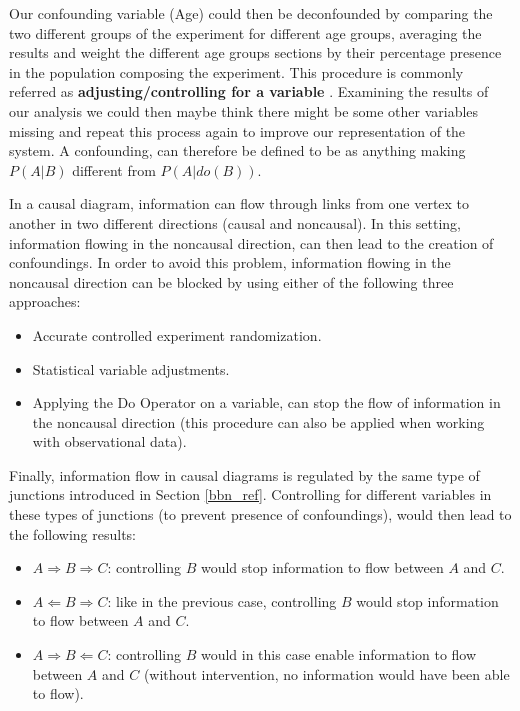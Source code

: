 Our confounding variable (Age) could then be deconfounded by comparing the two different groups of the experiment for different age groups, averaging the results and weight the different age groups sections by their percentage presence in the population composing the experiment. This procedure is commonly referred as \textbf{adjusting/controlling for a variable} \cite{why}. Examining the results of our analysis we could then maybe think there might be some other variables missing and repeat this process again to improve our representation of the system. A confounding, can therefore be defined to be as anything making $P(A|B)$ different from $P(A|do(B))$.   

In a causal diagram, information can flow through links from one vertex to another in two different directions (causal and noncausal). In this setting, information flowing in the noncausal direction, can then lead to the creation of confoundings. In order to avoid this problem, information flowing in the noncausal direction can be blocked by using either of the following three approaches:

\begin{itemize}
    \item Accurate controlled experiment randomization.
    \item Statistical variable adjustments.
    \item Applying the Do Operator on a variable, can stop the flow of information in the noncausal direction (this procedure can also be applied when working with observational data).
\end{itemize}

Finally, information flow in causal diagrams is regulated by the same type of junctions introduced in Section \ref{bbn_ref}. Controlling for different variables in these types of junctions (to prevent presence of confoundings), would then lead to the following results:

\begin{itemize}
    \item \textbf{$A \Rightarrow B \Rightarrow C$}: controlling $B$ would stop information to flow between $A$ and $C$.
    \item \textbf{$A \Leftarrow B \Rightarrow C$}: like in the previous case, controlling $B$ would stop information to flow between $A$ and $C$.
    \item \textbf{$A \Rightarrow B \Leftarrow C$}: controlling $B$ would in this case enable information to flow between $A$ and $C$ (without intervention, no information would have been able to flow).
\end{itemize}

